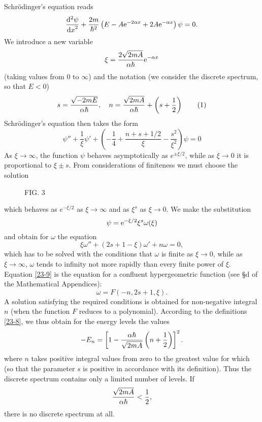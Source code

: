 {Schr\"odinger's equation reads
\[ \frac{\mathrm{d}^2 \psi}{{\mathrm{d} x}^2}+\frac{2m}{\hbar^2}\left(E-A\mathrm{e}^{-2\alpha x}+2A\mathrm{e}^{-\alpha x} \right)\psi=0. \]
We introduce a new variable
\[ \xi=\frac{2\sqrt{2mA}}{\alpha\hbar}\mathrm{e}^{-\alpha x} \]
(taking values from $ 0 $ to $\infty$) and the notation (we consider the discrete spectrum, so that $ E < 0 $)
\begin{equation}\label{23-8}
s=\frac{\sqrt{-2mE}}{\alpha\hbar},\quad n=\frac{\sqrt{2mA}}{\alpha\hbar}+\left(s+\frac{1}{2}\right)\tag{1}
\end{equation}
Schr\"odinger's equation then takes the form
\[ \psi''+\frac{1}{\xi}\psi'+\left(-\frac{1}{4}+\frac{n+s+1/2}{\xi}-\frac{s^2}{\xi^2} \right)\psi=0 \]
As $ \xi\to\infty  $, the function $\psi$ behaves asymptotically as $ e^{\pm\xi/2} $, while as $ \xi\to0  $ it is proportional to $ \xi\pm s $. From considerations of finiteness we must choose the solution
\begin{wrapfigure}[13]{l}[0cm]{0cm}
	\caption{FIG. 3}\label{Fig.3}
\end{wrapfigure}
which behaves as $ e^{-\xi/2} $ as $ \xi\to\infty $ and as $ \xi^s $ as $ \xi\to0  $. We make the substitution
\[ \psi=\mathrm{e}^{-\xi/2}\xi^s\omega(\xi) \]
and obtain for $\omega$ the equation
\begin{equation}\label{23-9}
\xi\omega''+(2s+1-\xi)\omega'+n\omega=0,\tag{2}
\end{equation}
which has to be solved with the conditions that $\omega$ is finite as $\xi\to0$, while as $\xi\to\infty$, $\omega$ tends to infinity not more rapidly than every finite power of $\xi$. Equation \eqref{23-9} is the equation for a confluent hypergeometric function (see \S d of the Mathematical Appendices):
\[ \omega=F(-n,2s+1,\xi). \]
A solution satisfying the required conditions is obtained for non-negative integral $ n $ (when the function $ F $ reduces to a polynomial). According to the definitions \eqref{23-8}, we thus obtain for the energy levels the values
\[ -E_n=\left[1-\frac{\alpha\hbar}{\sqrt{2mA}}\left(n+\frac{1}{2} \right) \right]^2. \]
where $ n $ takes positive integral values from zero to the greatest value for which (so that the parameter $ s $ is positive in accordance with its definition). Thus the discrete spectrum contains only a limited number of levels. If 
\[ \frac{\sqrt{2mA}}{\alpha\hbar}<\frac{1}{2}, \]
there is no discrete spectrum at all.





}
